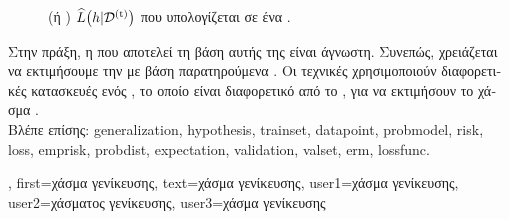 {{\begin{figure}[H]
{			 (\foreignlanguage{greek}{ή} ) 
			$\widehat{L}\big(h|\mathcal{D}^{(\rm t)}\big)$ \foreignlanguage{greek}{που υπολογίζεται σε ένα} .}
		\end{figure}
		\foreignlanguage{greek}{Στην πράξη, η}  \foreignlanguage{greek}{που αποτελεί τη βάση αυτής της} 
		 \foreignlanguage{greek}{είναι άγνωστη. Συνεπώς, χρειάζεται να εκτιμήσουμε την}
	  	 \foreignlanguage{greek}{με βάση παρατηρούμενα} . \foreignlanguage{greek}{Οι 
		τεχνικές}  \foreignlanguage{greek}{χρησιμοποιούν διαφορετικές κατασκευές ενός} , 
		\foreignlanguage{greek}{το οποίο είναι διαφορετικό από το} , \foreignlanguage{greek}{για να εκτιμήσουν 
		το χάσμα} .
		\\
		\foreignlanguage{greek}{Βλέπε επίσης:} \gls{generalization}, \gls{hypothesis}, \gls{trainset}, \gls{datapoint}, \gls{probmodel}, \gls{risk}, 
		\gls{loss}, \gls{emprisk}, \gls{probdist}, \gls{expectation}, \gls{validation}, \gls{valset}, \gls{erm}, \gls{lossfunc}.}, 
	first={\foreignlanguage{greek}{χάσμα γενίκευσης}}, 
	text={\foreignlanguage{greek}{χάσμα γενίκευσης}},
	user1={\foreignlanguage{greek}{χάσμα γενίκευσης}}, %
  	user2={\foreignlanguage{greek}{χάσματος γενίκευσης}}, %
	user3={\foreignlanguage{greek}{χάσμα γενίκευσης}} %
}

